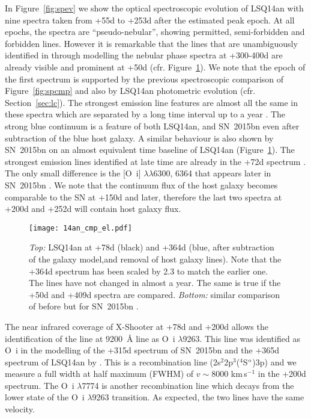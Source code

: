 \documentclass[useAMS,usenatbib]{mn2e}
\def\kms{km\,s$^{-1}$}
\def\an{LSQ14an}
\begin{document}
In Figure~\ref{fig:spev} we show the optical spectroscopic evolution of \an\/  with nine spectra
taken from  +55d to +253d after the estimated peak epoch. At all epochs, the spectra are ``pseudo-nebular'', showing permitted, semi-forbidden and forbidden lines.  However it is 
remarkable that the lines that are unambiguously
identified in \cite{je16} through modelling the 
nebular phase spectra at +300-400d are
already visible and prominent at +50d (cfr. Figure~\ref{fig:cmpel}). 
We note that the epoch of the first spectrum is 
supported by the previous spectroscopic comparison of Figure~\ref{fig:spcmp} and also by \an\/ photometric evolution (cfr. Section~\ref{sec:lc}).
The strongest emission line features are 
almost all the same in these spectra which are
separated by a long time interval up to a year 
\citep[see Figure~\ref{fig:cmpel} in this paper and fig.\,7 of][]{je16}. The strong blue 
continuum is a feature of both LSQ14an, and 
SN~2015bn even after subtraction of the blue
host galaxy. A similar behaviour is also shown by SN~2015bn on an almost equivalent time baseline of \an\/ (Figure~\ref{fig:cmpel}). The strongest emission lines identified at late time are already in the +72d spectrum \citep[and in any spectrum after $\sim$50d post peak; see][]{ni16a}. 
The only small difference is the [O~{\sc i}] $\lambda\lambda$6300, 6364 that appears later in SN~2015bn \citep{je16}. We note that the continuum flux of the host galaxy becomes comparable to the SN at +150d and 
later, therefore the last two spectra at +200d and +252d will contain host galaxy flux. 

\begin{figure}
\texttt{[image: 14an\_cmp\_el.pdf]}
\caption{{\it Top:} \an\/ at +78d (black) and +364d (blue, after subtraction of the galaxy model,and removal of host galaxy
lines). Note that the +364d spectrum \citep{je16} has been scaled by 2.3 to match the earlier one. The lines have not changed in almost a year. The same is true if the +50d and +409d \citep{je16} spectra are compared. {\it Bottom:} similar comparison of before but for SN~2015bn \citep{ni16a,je16}.}
\label{fig:cmpel}
\end{figure}


The near infrared coverage of X-Shooter 
at +78d and +200d allows the 
identification of the line at 9200~\AA\/ line as O~{\sc i} $\lambda$9263. 
This line was identified as
O~{\sc i} 
 in the modelling of the
+315d spectrum of SN~2015bn and the +365d 
spectrum of LSQ14an by  \cite{je16}. This
is a recombination line 
 (2s$^2$2p$^3$($^4$S$^{\rm o}$)3p) 
and we measure a  
full width at half maximum (FWHM) of 
$v\sim8000$ \kms\/ in the +200d spectrum. The O~{\sc i} $\lambda$7774 is another recombination line which decays from the lower state of the  O~{\sc i} $\lambda$9263 transition. 
As expected, the two lines have the same velocity. 
\end{document}
